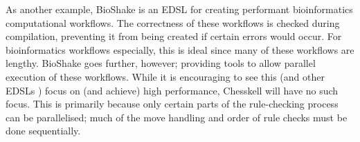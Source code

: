 \documentclass[12pt, a4paper, bibliography=totocnumbered]{scrartcl}
\begin{document}
As another example, BioShake \cite{bioshake} is an EDSL for creating performant bioinformatics computational workflows. The correctness of these workflows is checked during compilation, preventing it from being created if certain errors would occur. For bioinformatics workflows especially, this is ideal since many of these workflows are lengthy. BioShake goes further, however; providing tools to allow parallel execution of these workflows. While it is encouraging to see this (and other EDSLs \cite{aplite}) focus on (and achieve) high performance, Chesskell will have no such focus. This is primarily because only certain parts of the rule-checking process can be parallelised; much of the move handling and order of rule checks must be done sequentially.


\end{document}
